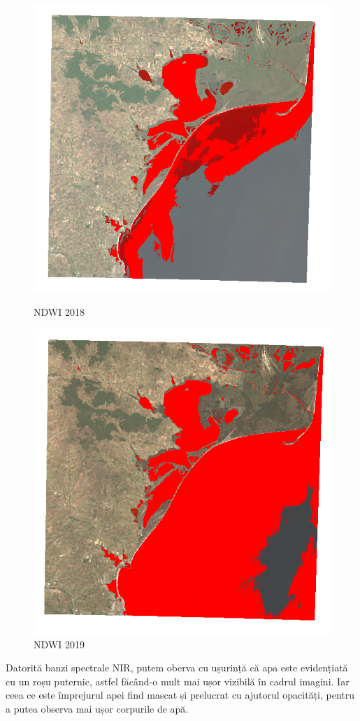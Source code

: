 \documentclass[12pt,a4paper]{article}
\theoremstyle{definition}
\theoremstyle{remark}
\begin{document}
\begin{figure}[!htb]
   \begin{minipage}{0.48\textwidth}
     \centering
     \includegraphics[width=1\linewidth]{ndwinou2.PNG}
     \caption{NDWI 2018}
   \end{minipage}\hfill
   \begin{minipage}{0.48\textwidth}
     \centering
     \includegraphics[width=1\linewidth]{ndwinou.PNG}
     \caption{NDWI 2019}
   \end{minipage}
\end{figure}
Datorită banzi  spectrale NIR, putem oberva cu ușurință că apa este evidențiată cu un roșu puternic, astfel făcând-o mult mai ușor vizibilă în cadrul imagini. Iar ceea ce este împrejurul apei find mascat și prelucrat cu ajutorul opacități, pentru a putea observa mai ușor corpurile de apă.
\end{document}
